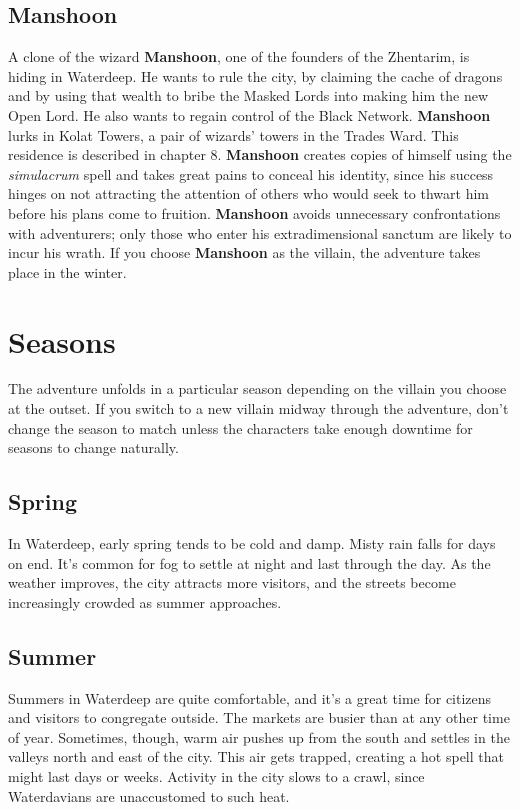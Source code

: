 \documentclass[10pt,a4paper,twoside,twocolumn,openany,nodeprecatedcode]{dndbook}
\begin{document}
\subsection{Manshoon}
A clone of the wizard \textbf{Manshoon}, one of the founders of the Zhentarim, is hiding in Waterdeep. He wants to rule the city, by claiming the cache of dragons and by using that wealth to bribe the Masked Lords into making him the new Open Lord. He also wants to regain control of the Black Network. \textbf{Manshoon} lurks in Kolat Towers, a pair of wizards' towers in the Trades Ward. This residence is described in chapter 8.
\textbf{Manshoon} creates copies of himself using the \textit{simulacrum} spell and takes great pains to conceal his identity, since his success hinges on not attracting the attention of others who would seek to thwart him before his plans come to fruition. \textbf{Manshoon} avoids unnecessary confrontations with adventurers; only those who enter his extradimensional sanctum are likely to incur his wrath.
If you choose \textbf{Manshoon} as the villain, the adventure takes place in the winter.
\section{Seasons}
The adventure unfolds in a particular season depending on the villain you choose at the outset. If you switch to a new villain midway through the adventure, don't change the season to match unless the characters take enough downtime for seasons to change naturally.
\subsection{Spring}
In Waterdeep, early spring tends to be cold and damp. Misty rain falls for days on end. It's common for fog to settle at night and last through the day. As the weather improves, the city attracts more visitors, and the streets become increasingly crowded as summer approaches.
\subsection{Summer}
Summers in Waterdeep are quite comfortable, and it's a great time for citizens and visitors to congregate outside. The markets are busier than at any other time of year. Sometimes, though, warm air pushes up from the south and settles in the valleys north and east of the city. This air gets trapped, creating a hot spell that might last days or weeks. Activity in the city slows to a crawl, since Waterdavians are unaccustomed to such heat.
\end{document}
